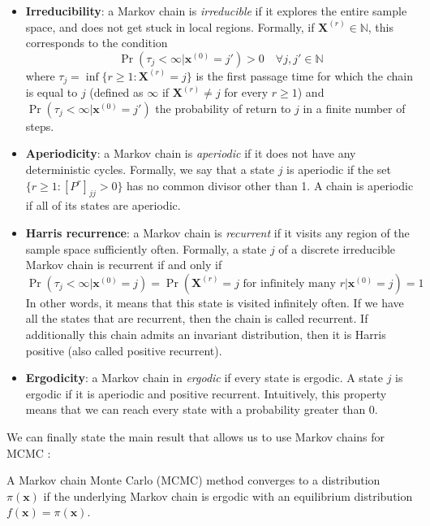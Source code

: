 \documentclass[12pt]{memoir}
\newcommand{\mb}{\mathbf}
\newcommand{\tb}{\textbf}
\newcommand{\ti}{\textit}
\begin{document}
\begin{itemize}
    \item \tb{Irreducibility}: a Markov chain is \ti{irreducible} if it explores the entire sample space, and does not get stuck in local regions. Formally, if $\mb X^{(r)}\in \mathbb{N}$, this corresponds to the condition 
    \begin{equation}
        \Pr(\tau_j < \infty | \mb x^{(0)} = j') > 0\quad \forall j,j' \in \mathbb{N}
    \end{equation} 
    where $\tau_j = \inf\{r\geq 1: \mb X^{(r)} = j\}$ is the first passage time for which the chain is equal to $j$ (defined as $\infty$ if $\mb X^{(r)} \neq j$ for every $r\geq 1$) and $\Pr(\tau_j < \infty | \mb x^{(0)} = j')$ the probability of return to $j$ in a finite number of steps.
    \item \tb{Aperiodicity}: a Markov chain is \ti{aperiodic} if it does not have any deterministic cycles. Formally, we say that a state $j$ is aperiodic if the set $\{r\geq1: [P^r]_{jj} > 0\}$ has no common divisor other than 1. A chain is aperiodic if all of its states are aperiodic.
    \item \tb{Harris recurrence}:  a Markov chain is \ti{recurrent} if it visits any region of the sample space sufficiently often. Formally, a state $j$ of a discrete irreducible Markov chain is recurrent if and only if
    \begin{equation}
        \Pr(\tau_j < \infty |\mb x^{(0)} = j) = \Pr(\mb X^{(r)} = j \text{ for infinitely many } r | \mb x^{(0)}=j) = 1
    \end{equation}
    In other words, it means that this state is visited infinitely often. If we have all the states that are recurrent, then the chain is called recurrent. If additionally this chain admits an invariant distribution, then it is Harris positive (also called positive recurrent).
    \item \tb{Ergodicity}: a Markov chain in \ti{ergodic} if every state is ergodic. A state $j$ is ergodic if it is aperiodic and positive recurrent. Intuitively, this property means that we can reach every state with a probability greater than 0.
\end{itemize}
We can finally state the main result that allows us to use Markov chains for MCMC \cite{mcmc:RobertCasella2004}:
\begin{boxedthm}
    A Markov chain Monte Carlo (MCMC) method converges to a distribution $\pi(\mb x)$ if the underlying Markov chain is ergodic with an equilibrium distribution $f(\mb x) = \pi (\mb x)$.
\end{boxedthm}
\end{document}
